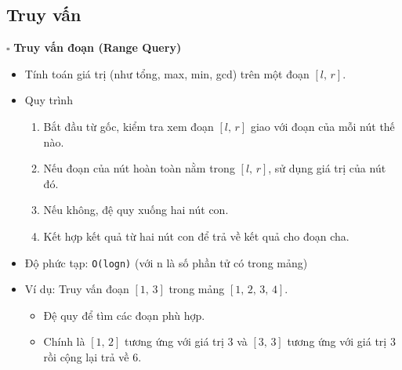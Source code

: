 \documentclass[a4paper]{article}
\begin{document}
\subsection{Truy vấn}
\noindent $\square$ \textbf{Truy vấn đoạn (Range Query)}
\begin{itemize}[label = $\circ$]
    \item Tính toán giá trị (như tổng, max, min, gcd) trên một đoạn $[l,\,r]$.
    \item Quy trình
    \begin{enumerate}
        \item Bắt đầu từ gốc, kiểm tra xem đoạn $[l,\,r]$ giao với đoạn của mỗi nút thế nào.
        \item Nếu đoạn của nút hoàn toàn nằm trong $[l,\,r]$, sử dụng giá trị của nút đó.
        \item Nếu không, đệ quy xuống hai nút con.
        \item Kết hợp kết quả từ hai nút con để trả về kết quả cho đoạn cha.
    \end{enumerate}
    \item Độ phức tạp: \texttt{O(logn)} (với n là số phần tử có trong mảng)
    \item Ví dụ: Truy vấn đoạn $[1,\,3]$ trong mảng $[1,\,2,\,3,\,4]$.
    \begin{itemize}[label = $\bullet$]
        \item Đệ quy để tìm các đoạn phù hợp.
        \item Chính là $[1,\,2]$ tương ứng với giá trị 3 và $[3,\,3]$ tương ứng với giá trị 3 rồi cộng lại trả về 6.
    \end{itemize}
    \begin{table}[tbh!]
        \large
        \begin{minipage}[t]{1.6in}
        \end{minipage}
        \begin{minipage}[c]{0.5in}
            \begin{center}
                \begin{tikzpicture}

\end{tikzpicture}
\end{center}
\end{minipage}
\end{table}
\end{itemize}
\end{document}
